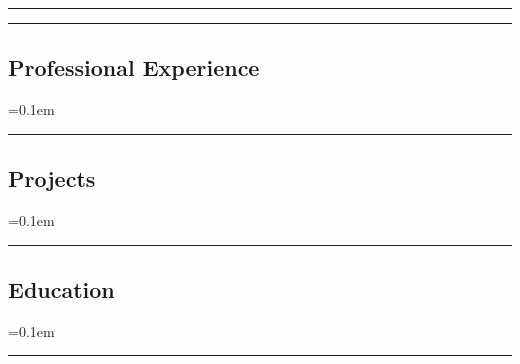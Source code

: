 





\hrule
\begin{indentsection}{\parindent}
\begin{description*}
  
  
\end{description*}
\end{indentsection}

\hrule
\vspace{-0.4em}
\subsection*{Professional Experience}
\begin{itemize}
  \parskip=0.1em
  
  
  
\end{itemize}

\hrule
\vspace{-0.4em}
\subsection*{Projects}
\begin{itemize}
  \parskip=0.1em
  
  
  
  
  
  
\end{itemize}


\hrule
\vspace{-0.4em}
\subsection*{Education}
\begin{itemize}
  \parskip=0.1em

  
\end{itemize}
\hrule

